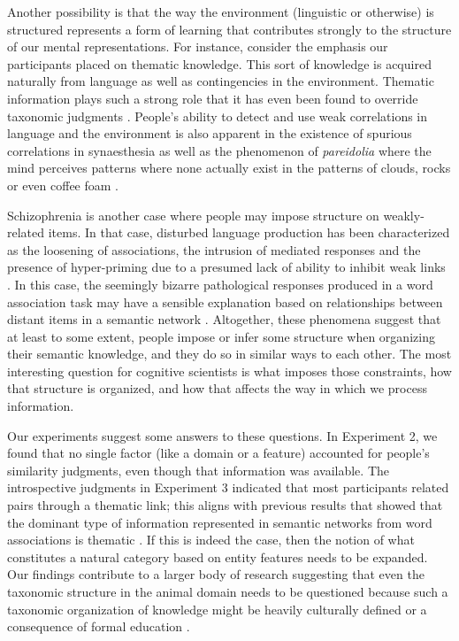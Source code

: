 \documentclass[doc]{apa6}
\begin{document}
Another possibility is that the way the environment (linguistic or otherwise) is structured represents a form of learning that contributes strongly to the structure of our mental representations. For instance, consider the emphasis our participants placed on thematic knowledge. This sort of knowledge is acquired naturally from language \parencite{EstesGolonka2011} as well as contingencies in the environment. Thematic information plays such a strong role that it has even been found to override taxonomic judgments \parencite{Lin2001,Wisniewski1999}. People's ability to detect and use weak correlations in language and the environment is also apparent in the existence of spurious correlations in synaesthesia as well as the phenomenon of \textit{pareidolia} where the mind perceives patterns where none actually exist in the patterns of clouds, rocks or even coffee foam \parencite[e.g.,][]{Liu2014}.

Schizophrenia is another case where people may impose structure on weakly-related items. In that case, disturbed language production has been characterized as the loosening of associations, the intrusion of mediated responses and the presence of hyper-priming due to a presumed lack of ability to inhibit weak links \parencite{Pomarol-Clotet2008}. In this case, the seemingly bizarre pathological responses  produced in a word association task may have a sensible explanation based on relationships between distant items in a semantic network \parencite{Gordon1982}. Altogether, these phenomena suggest that at least to some extent, people impose or infer some structure when organizing their semantic knowledge, and they do so in similar ways to each other. The most interesting question for cognitive scientists is what imposes those constraints, how that structure is organized, and how that affects the way in which we process information.

Our experiments suggest some answers to these questions. In Experiment 2, we found that no single factor (like a domain or a feature) accounted for people's similarity judgments, even though that information was available. The introspective judgments in Experiment 3 indicated that most participants related pairs through a thematic link; this aligns with previous results that showed that the dominant type of information represented in semantic networks from word associations is thematic \parencite{DeDeyne2008b}. If this is indeed the case, then the notion of what constitutes a natural category \parencite[e.g., as proposed by][ as an organizing factor of the mental lexicon]{Rosch1973} based on entity features needs to be expanded. Our findings contribute to a larger body of research suggesting that even the taxonomic structure in the animal domain needs to be questioned because such a taxonomic organization of knowledge might be heavily culturally defined \parencite{LopezAtran1997} or a consequence of formal education \parencite{SharpCole1979}.
\end{document}
